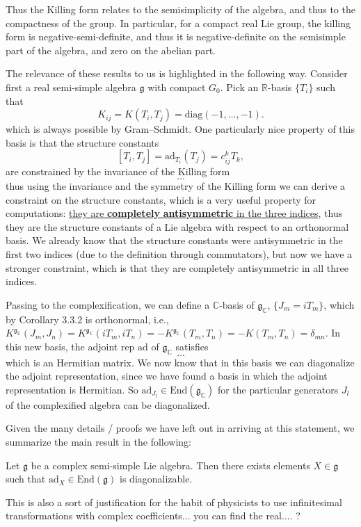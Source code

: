 Thus the Killing form relates to the semisimplicity of the algebra, and thus to the compactness of the group. In particular, for a compact real Lie group, the killing form is negative-semi-definite, and thus it is negative-definite on the semisimple part of the algebra, and zero on the abelian part.

The relevance of these results to us is highlighted in the following way. Consider first a real semi-simple algebra \(\mathfrak{g}\) with compact \(G_0\). Pick an \(\mathbb{R}\)-basis \(\{T_i\}\) such that
\[
    K_{ij} = K(T_i, T_j) = \text{diag}\left(-1, \dots, -1\right).
\]
which is always possible by Gram–Schmidt. One particularly nice property of this basis is that the structure constants
\[
    [T_i, T_j] = \mathrm{ad}_{T_i}(T_j) = c_{ij}^k T_k,
\]
are constrained by the invariance of the Killing form
\[
    \dots
\]
thus using the invariance and the symmetry of the Killing form we can derive a constraint on the structure constants, which is a very useful property for computations: \uline{they are \textbf{completely} \textbf{antisymmetric} in the three indices}, thus they are the structure constants of a Lie algebra with respect to an orthonormal basis. We already know that the structure constants were antisymmetric in the first two indices (due to the definition through commutators), but now we have a stronger constraint, which is that they are completely antisymmetric in all three indices.

Passing to the complexification, we can define a \(\mathbb{C}\)-basis of \(\mathfrak{g}_\mathbb{C}\), \(\{J_m = i T_m\}\), which by Corollary 3.3.2 is orthonormal, i.e., \(K^{\mathfrak{g}_\mathbb{C}}(J_m, J_n) = K^{\mathfrak{g}_\mathbb{C}}(i T_m, i T_n) = -K^{\mathfrak{g}_\mathbb{C}}(T_m, T_n) = -K(T_m, T_n) = \delta_{mn}\). In this new basis, the adjoint rep \(\mathrm{ad}\) of \(\mathfrak{g}_\mathbb{C}\) satisfies
\[
    \dots
\]
which is an Hermitian matrix. We now know that in this basis we can diagonalize the adjoint representation, since we have found a basis in which the adjoint representation is Hermitian. So \(\mathrm{ad}_{J_l} \in \mathrm{End}(\mathfrak{g}_\mathbb{C}) \) for the particular generators \(J_l\) of the complexified algebra can be diagonalized.

Given the many details / proofs we have left out in arriving at this statement, we summarize the main result in the following:
\begin{corollary}
    Let \(\mathfrak{g}\) be a complex semi-simple Lie algebra. Then there exists elements \(X \in \mathfrak{g}\) such that \(\mathrm{ad}_X \in \mathrm{End}(\mathfrak{g})\) is diagonalizable.
\end{corollary}
This is also a sort of justification for the habit of physicists to use infinitesimal transformations with complex coefficients... you can find the real.... ?

